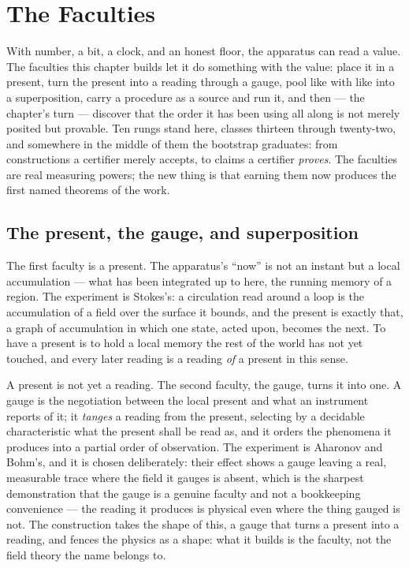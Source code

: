 \chapter{The Faculties}
\label{chap:the-faculties}

With number, a bit, a clock, and an honest floor, the apparatus can read a value. The faculties this
chapter builds let it do something with the value: place it in a present, turn the present into a reading
through a gauge, pool like with like into a superposition, carry a procedure as a source and run it, and
then --- the chapter's turn --- discover that the order it has been using all along is not merely posited
but provable. Ten rungs stand here, classes thirteen through twenty-two, and somewhere in the middle of
them the bootstrap graduates: from constructions a certifier merely accepts, to claims a certifier
\emph{proves}. The faculties are real measuring powers; the new thing is that earning them now produces
the first named theorems of the work.

\section{The present, the gauge, and superposition}
\label{se:present-gauge-superposition}

The first faculty is a present. The apparatus's ``now'' is not an instant but a local accumulation --- what
has been integrated up to here, the running memory of a region. The experiment is Stokes's: a circulation
read around a loop is the accumulation of a field over the surface it bounds, and the present is exactly
that, a graph of accumulation in which one state, acted upon, becomes the next. To have a present is to
hold a local memory the rest of the world has not yet touched, and every later reading is a reading
\emph{of} a present in this sense.

A present is not yet a reading. The second faculty, the gauge, turns it into one. A gauge is the
negotiation between the local present and what an instrument reports of it; it \emph{tanges} a reading from
the present, selecting by a decidable characteristic what the present shall be read as, and it orders the
phenomena it produces into a partial order of observation. The experiment is Aharonov and Bohm's, and it is
chosen deliberately: their effect shows a gauge leaving a real, measurable trace where the field it gauges
is absent, which is the sharpest demonstration that the gauge is a genuine faculty and not a bookkeeping
convenience --- the reading it produces is physical even where the thing gauged is not. The construction
takes the shape of this, a gauge that turns a present into a reading, and fences the physics as a shape:
what it builds is the faculty, not the field theory the name belongs to.

